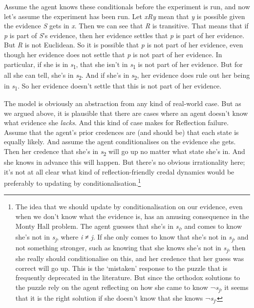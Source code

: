 \documentclass[
  11pt,
  letterpaper,
  DIV=11,
  numbers=noendperiod,
  twoside]{scrartcl}
\begin{document}
Assume the agent knows these conditionals before the experiment is run,
and now let's assume the experiment has been run. Let \emph{xRy} mean
that \emph{y} is possible given the evidence \emph{S} gets in \emph{x}.
Then we can see that \emph{R} is transitive. That means that if \emph{p}
is part of \emph{S}'s evidence, then her evidence settles that \emph{p}
is part of her evidence. But \emph{R} is not Euclidean. So it is
possible that \emph{p} is not part of her evidence, even though her
evidence does not settle that \emph{p} is not part of her evidence. In
particular, if she is in \emph{s}\textsubscript{1}, that she isn't in
\emph{s}\textsubscript{1} is not part of her evidence. But for all she
can tell, she's in \emph{s}\textsubscript{2}. And if she's in
\emph{s}\textsubscript{2}, her evidence does rule out her being in
\emph{s}\textsubscript{1}. So her evidence doesn't settle that this is
not part of her evidence.

The model is obviously an abstraction from any kind of real-world case.
But as we argued above, it is plausible that there are cases where an
agent doesn't know what evidence she \emph{lacks}. And this kind of case
makes for Reflection failure. Assume that the agent's prior credences
are (and should be) that each state is equally likely. And assume the
agent conditionalises on the evidence she gets. Then her credence that
she's in \emph{s}\textsubscript{2} will go up no matter what state she's
in. And she knows in advance this will happen. But there's no obvious
irrationality here; it's not at all clear what kind of
reflection-friendly credal dynamics would be preferably to updating by
conditionalisation.\footnote{The idea that we should update by
  conditionalisation on our evidence, even when we don't know what the
  evidence is, has an amusing consequence in the Monty Hall problem. The
  agent guesses that she's in \emph{s\textsubscript{i}}, and comes to
  know she's not in \emph{s\textsubscript{j}}, where \emph{i} ≠
  \emph{j}. If she only comes to know that she's not in
  \emph{s\textsubscript{j}}, and not something stronger, such as knowing
  that she knows she's not in \emph{s\textsubscript{j}}, then she really
  should conditionalise on this, and her credence that her guess was
  correct will go up. This is the `mistaken' response to the puzzle that
  is frequently deprecated in the literature. But since the orthodox
  solutions to the puzzle rely on the agent reflecting on how she came
  to know ¬\emph{s\textsubscript{j}}, it seems that it is the right
  solution if she doesn't know that she knows
  ¬\emph{s\textsubscript{j}}.}
\end{document}
